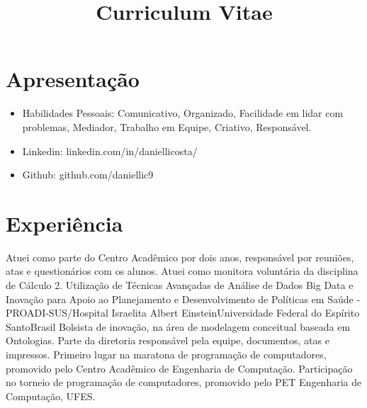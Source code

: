 \documentclass[11pt, a4paper, roman]{moderncv} %
\title{Curriculum Vitae}
\begin{document}
\makecvtitle %

\section{Apresentação}
{
    \begin{itemize}
        \item Habilidades Pessoais: Comunicativo, Organizado, Facilidade em lidar com problemas, Mediador, Trabalho em Equipe, Criativo, Responsável.  
        \item Linkedin: linkedin.com/in/daniellicosta/
        \item Github: github.com/daniellic9
    \end{itemize} 
}
\section{Experiência}
{
   Atuei como parte do Centro Acadêmico por dois anos, responsável por reuniões, atas e questionários com os alunos.
}
{
   Atuei como monitora voluntária da disciplina de Cálculo 2.
}
 {Utilização de Técnicas Avançadas de Análise de Dados Big Data e Inovação para Apoio ao Planejamento e Desenvolvimento de Políticas em Saúde - PROADI-SUS/Hospital Israelita Albert Einstein}{Universidade Federal do Espírito Santo}{Brasil}
{ 
    Bolsista de inovação, na área de modelagem conceitual baseada em Ontologias.
}
{
   Parte da diretoria responsável pela equipe, documentos, atas e impressos. 
}
{
    Primeiro lugar na maratona de programação de computadores, promovido pelo Centro Acadêmico de Engenharia de Computação.
}
{
  Participação no torneio de programação de computadores, promovido pelo PET Engenharia de Computação, UFES.
}
\end{document}
